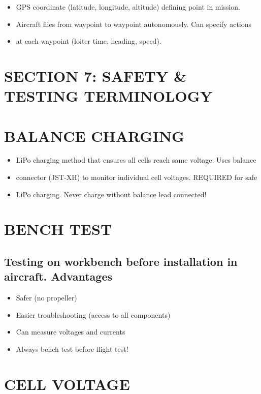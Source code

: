 \documentclass[11pt,letterpaper]{article}
\begin{document}
\begin{itemize}
  \item GPS coordinate (latitude, longitude, altitude) defining point in mission.
  \item Aircraft flies from waypoint to waypoint autonomously. Can specify actions
  \item at each waypoint (loiter time, heading, speed).
\end{itemize}

\section{SECTION 7: SAFETY \& TESTING TERMINOLOGY}

\section{BALANCE CHARGING}

\begin{itemize}
  \item LiPo charging method that ensures all cells reach same voltage. Uses balance
  \item connector (JST-XH) to monitor individual cell voltages. REQUIRED for safe
  \item LiPo charging. Never charge without balance lead connected!
\end{itemize}

\section{BENCH TEST}

\subsection{Testing on workbench before installation in aircraft. Advantages}

\begin{itemize}
  \item Safer (no propeller)
  \item Easier troubleshooting (access to all components)
  \item Can measure voltages and currents
  \item Always bench test before flight test!
\end{itemize}

\section{CELL VOLTAGE}
\end{document}
